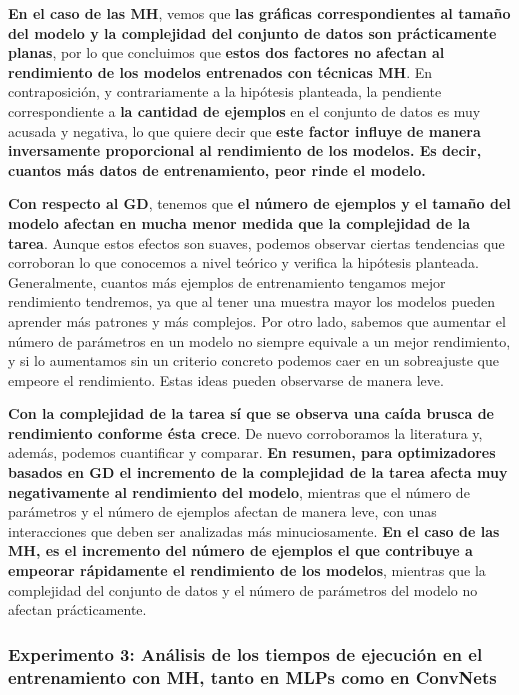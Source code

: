 \textbf{En el caso de las MH}, vemos que \textbf{las gráficas correspondientes al tamaño del modelo y la complejidad del conjunto de datos son prácticamente planas}, por lo que concluimos que \textbf{estos dos factores no afectan al rendimiento de los modelos entrenados con técnicas MH}. En contraposición, y contrariamente a la hipótesis planteada, la pendiente correspondiente a \textbf{la cantidad de ejemplos} en el conjunto de datos es muy acusada y negativa, lo que quiere decir que \textbf{este factor influye de manera inversamente proporcional al rendimiento de los modelos. Es decir, cuantos más datos de entrenamiento, peor rinde el modelo.}


\textbf{Con respecto al GD}, tenemos que \textbf{el número de ejemplos y el tamaño del modelo afectan en mucha menor medida que la complejidad de la tarea}. Aunque estos efectos son suaves, podemos observar ciertas tendencias que corroboran lo que conocemos a nivel teórico y verifica la hipótesis planteada. Generalmente, cuantos más ejemplos de entrenamiento tengamos mejor rendimiento tendremos, ya que al tener una muestra mayor los modelos pueden aprender más patrones y más complejos. Por otro lado, sabemos que aumentar el número de parámetros en un modelo no siempre equivale a un mejor rendimiento, y si lo aumentamos sin un criterio concreto podemos caer en un sobreajuste que empeore el rendimiento. Estas ideas pueden observarse de manera leve.

\textbf{Con la complejidad de la tarea sí que se observa una caída brusca de rendimiento conforme ésta crece}. De nuevo corroboramos la literatura y, además, podemos cuantificar y comparar. \textbf{En resumen, para optimizadores basados en GD el incremento de la complejidad de la tarea afecta muy negativamente al rendimiento del modelo}, mientras que el número de parámetros y el número de ejemplos afectan de manera leve, con unas interacciones que deben ser analizadas más minuciosamente. \textbf{En el caso de las MH, es el incremento del número de ejemplos el que contribuye a empeorar rápidamente el rendimiento de los modelos}, mientras que la complejidad del conjunto de datos y el número de parámetros del modelo no afectan prácticamente.






\subsubsection{Experimento 3: Análisis de los tiempos de ejecución en el entrenamiento con MH, tanto en MLPs como en ConvNets}

